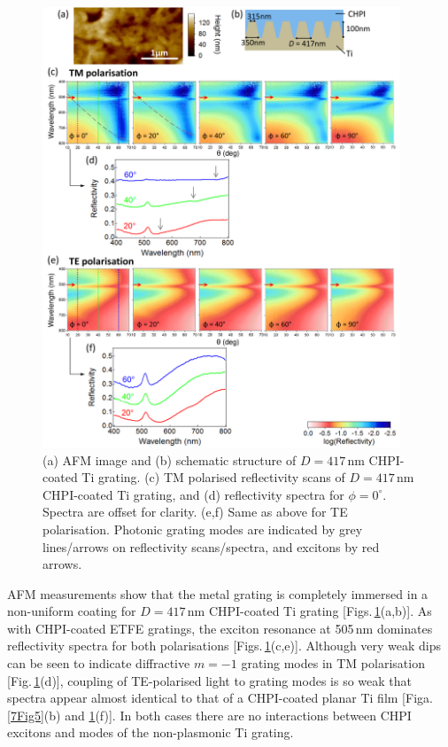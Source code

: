 \begin{figure}[h!] 
\centering    
\includegraphics[width=0.95\textwidth]{Fig6}
\caption[(a) AFM image and (b) schematic structure of $D=417$\,nm CHPI-coated Ti grating. Reflectivity measurements of CHPI-coated Ti grating in (c,d) TM and (e.f) TE polarisation.]{(a) AFM image and (b) schematic structure of $D=417$\,nm CHPI-coated Ti grating. (c) TM polarised reflectivity scans of $D=417$\,nm CHPI-coated Ti grating, and (d) reflectivity spectra for $\phi=0^{\circ}$. Spectra are offset for clarity. (e,f) Same as above for TE polarisation. Photonic grating modes are indicated by grey lines/arrows on reflectivity scans/spectra, and excitons by red arrows.}
\label{7Fig6}
\end{figure}
AFM measurements show that the metal grating is completely immersed in a non-uniform coating for $D=417$\,nm CHPI-coated Ti grating [Figs.\,\ref{7Fig6}(a,b)]. As with CHPI-coated ETFE gratings, the exciton resonance at 505\,nm dominates reflectivity spectra for both polarisations [Figs.\,\ref{7Fig6}(c,e)]. Although very weak dips can be seen to indicate diffractive $m=-1$ grating modes in TM polarisation [Fig.\,\ref{7Fig6}(d)], coupling of TE-polarised light to grating modes is so weak that spectra appear almost identical to that of a CHPI-coated planar Ti film [Figa.\,\ref{7Fig5}(b) and \ref{7Fig6}(f)]. In both cases there are no interactions between CHPI excitons and modes of the non-plasmonic Ti grating.



